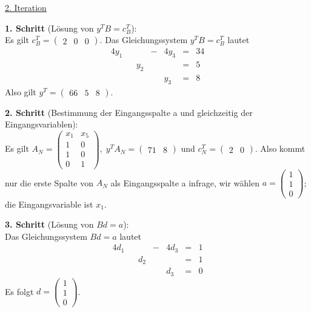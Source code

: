 \documentclass[10pt,a4paper,oneside,ngerman,numbers=noenddot]{scrartcl}
\begin{document}
		\underline{2. Iteration}
		
		\textbf{1. Schritt} (Lösung von $y^{T}B = c_{B}^{T}$):\\
		Es gilt $c_{B}^{T} = \begin{pmatrix} 2 & 0 & 0 \end{pmatrix}$. Das Gleichungssystem $y^{T}B = c_{B}^{T}$ lautet
		\begin{alignat*}{4}
			y_{1} && &-& 4y_{3} &=& 34 \\
			&& y_{2} && &=& 5 \\
			&& && y_{3} &=& 8
		\end{alignat*}
		Also gilt $y^{T} = \begin{pmatrix} 66 & 5 & 8 \end{pmatrix}$.
		
		\textbf{2. Schritt} (Bestimmung der Eingangsspalte a und gleichzeitig der Eingangsvariablen):\\
		Es gilt $A_{N} = \begin{pmatrix} x_{1} & x_{5} \\ 1 & 0 \\ 1 & 0 \\ 0 & 1 \end{pmatrix},\; y^{T}A_{N} = \begin{pmatrix} 71 & 8 \end{pmatrix}$ und $c_{N}^{T} = \begin{pmatrix} 2 & 0 \end{pmatrix}$. Also kommt nur die erste Spalte von $A_{N}$ als Eingangsspalte a infrage, wir wählen $a = \begin{pmatrix} 1 \\ 1 \\ 0 \end{pmatrix}$; die Eingangsvariable ist $x_{1}$.
		
		\textbf{3. Schritt} (Lösung von $Bd = a$):\\
		Das Gleichungssystem $Bd = a$ lautet
		\begin{alignat*}{4}
			d_{1} && &-& 4d_{3} &=& 1 \\
			&& d_{2} && &=& 1 \\
			&& && d_{3} &=& 0
		\end{alignat*}
		Es folgt $d = \begin{pmatrix}1 \\ 1 \\ 0 \end{pmatrix}$.
		
\end{document}
